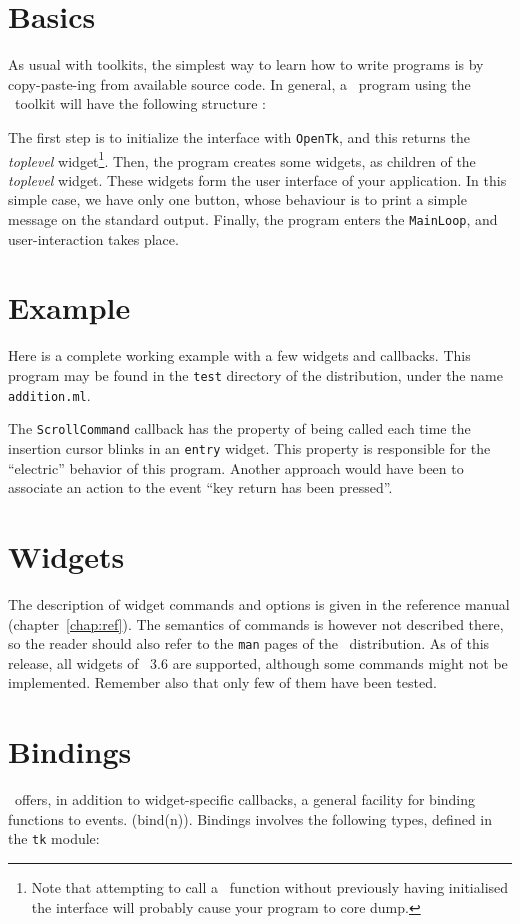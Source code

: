 \section{Basics}
As usual with toolkits, the simplest way to learn how to write programs is
by copy-paste-ing from available source code. In general, a \caml\ program
using the \tk\ toolkit will have the following structure :



The first step is to initialize the interface with \verb|OpenTk|, and this
returns the {\em toplevel} widget\footnote{Note that attempting to call a
\camltk\ function without previously having initialised the interface will
probably cause your program to core dump.}.
Then, the program creates some widgets, as children of the {\em toplevel}
widget. These widgets form the user interface of your application. In this
simple case, we have only one button, whose behaviour is to print a simple
message on the standard output. Finally, the program enters the
\verb|MainLoop|, and user-interaction takes place.

\section{Example}
Here is a complete working example with a few widgets and callbacks.
This program may be found in the \verb|test| directory of the distribution,
under the name \verb|addition.ml|.



The \verb|ScrollCommand| callback has the property of being called each time
the insertion cursor blinks in an \verb|entry| widget. This property is
responsible for the ``electric'' behavior of this program. Another approach
would have been to associate an action to the event ``key return has been 
pressed''.

\section{Widgets}
The description of widget commands and options is given in the reference
manual (chapter~\ref{chap:ref}). The semantics of commands is however not
described there, so the reader should also refer to the \verb|man| pages of
the \tk\ distribution. 
As of this release, all widgets of \tk\ 3.6 are supported, although some
commands might not be implemented. Remember also that only few of them have
been tested.

\section{Bindings}
\tk\ offers, in addition to widget-specific callbacks, a general facility
for binding functions to events. (bind(n)).
Bindings involves the following types, defined in the \verb|tk| module:


